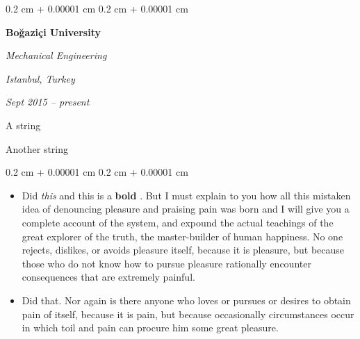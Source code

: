 \documentclass[10pt, letterpaper]{article}
\newenvironment{summary}{
    \begin{description}[
        topsep=0.10 cm,
        parsep=0.10 cm,
        partopsep=0pt,
        itemsep=0pt,
        leftmargin=0.4 cm + 10pt
    ]
}{
    \end{description}
} %
\newenvironment{highlights}{
    \begin{itemize}[
        topsep=0.10 cm,
        parsep=0.10 cm,
        partopsep=0pt,
        itemsep=0pt,
        leftmargin=0.4 cm + 10pt
    ]
}{
    \end{itemize}
} %
\newenvironment{onecolentry}{
    \begin{adjustwidth}{
        0.2 cm + 0.00001 cm
    }{
        0.2 cm + 0.00001 cm
    }
}{
    \end{adjustwidth}
} %
\newenvironment{twocolentry}[2][]{
    \onecolentry
    \def\secondColumn{#2}
    \setcolumnwidth{\fill, 4.5 cm}
    \begin{paracol}{2}
}{
    \switchcolumn \raggedleft \secondColumn
    \end{paracol}
    \endonecolentry
} %
\let\hrefWithoutArrow\href
\renewcommand{\href}[2]{\hrefWithoutArrow{#1}{\ifthenelse{\equal{#2}{}}{ }{#2 }\raisebox{.15ex}{\footnotesize \faExternalLink*}}}
\begin{document}
        \begin{twocolentry}{
        \textit{Istanbul, Turkey}    
            
        \textit{Sept 2015 – present}}
            \textbf{Boğaziçi University}

            \textit{Mechanical Engineering}
        \end{twocolentry}
            \begin{summary}
                \item A string
                \item Another string
            \end{summary}
        \vspace{0.10 cm}
        \begin{onecolentry}
            \begin{highlights}
                \item Did \textit{this} and this is a \textbf{bold} \href{https://example.com}{link}. But I must explain to you how all this mistaken idea of denouncing pleasure and praising pain was born and I will give you a complete account of the system, and expound the actual teachings of the great explorer of the truth, the master-builder of human happiness. No one rejects, dislikes, or avoids pleasure itself, because it is pleasure, but because those who do not know how to pursue pleasure rationally encounter consequences that are extremely painful.
                \item Did that. Nor again is there anyone who loves or pursues or desires to obtain pain of itself, because it is pain, but because occasionally circumstances occur in which toil and pain can procure him some great pleasure.
            \end{highlights}
        \end{onecolentry}


        \vspace{0.2 cm}
\end{document}
